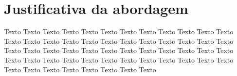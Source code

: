 \chapter{Justificativa da abordagem}

  Texto Texto Texto Texto Texto Texto Texto Texto Texto Texto Texto Texto Texto Texto
  Texto Texto Texto Texto Texto Texto Texto Texto Texto Texto Texto Texto Texto Texto
  Texto Texto Texto Texto Texto Texto Texto Texto Texto Texto Texto Texto Texto Texto
  Texto Texto Texto Texto Texto Texto Texto Texto Texto Texto Texto Texto Texto Texto

